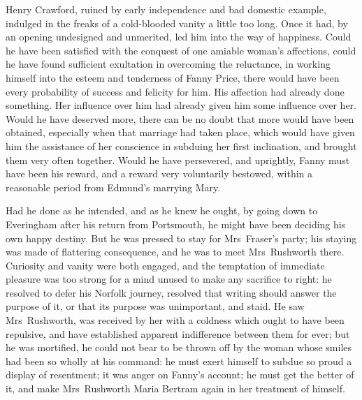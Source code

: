 Henry Crawford, ruined by early independence and bad domestic example, indulged in the freaks of a cold-blooded vanity a little too long. Once it had, by an opening undesigned and unmerited, led him into the way of happiness. Could he have been satisfied with the conquest of one amiable woman's affections, could he have found sufficient exultation in overcoming the reluctance, in working himself into the esteem and tenderness of Fanny Price, there would have been every probability of success and felicity for him. His affection had already done something. Her influence over him had already given him some influence over her. Would he have deserved more, there can be no doubt that more would have been obtained, especially when that marriage had taken place, which would have given him the assistance of her conscience in subduing her first inclination, and brought them very often together. Would he have persevered, and uprightly, Fanny must have been his reward, and a reward very voluntarily bestowed, within a reasonable period from Edmund's marrying Mary.

Had he done as he intended, and as he knew he ought, by going down to Everingham after his return from Portsmouth, he might have been deciding his own happy destiny. But he was pressed to stay for Mrs~Fraser's party; his staying was made of flattering consequence, and he was to meet Mrs~Rushworth there. Curiosity and vanity were both engaged, and the temptation of immediate pleasure was too strong for a mind unused to make any sacrifice to right: he resolved to defer his Norfolk journey, resolved that writing should answer the purpose of it, or that its purpose was unimportant, and staid. He saw Mrs~Rushworth, was received by her with a coldness which ought to have been repulsive, and have established apparent indifference between them for ever; but he was mortified, he could not bear to be thrown off by the woman whose smiles had been so wholly at his command: he must exert himself to subdue so proud a display of resentment; it was anger on Fanny's account; he must get the better of it, and make Mrs~Rushworth Maria Bertram again in her treatment of himself.

